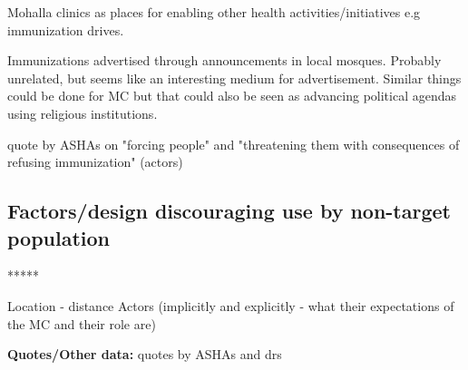Mohalla clinics as places for enabling other health activities/initiatives e.g immunization drives.

Immunizations advertised through announcements in local mosques. Probably unrelated, but seems like an interesting medium for advertisement. Similar things could be done for MC but that could also be seen as advancing political agendas using religious institutions.

quote by ASHAs on "forcing people" and "threatening them with consequences of refusing immunization" (actors)

\subsection{Factors/design discouraging use by non-target population}

*****

Location - distance
Actors (implicitly and explicitly - what their expectations of the MC and their role are)

\textbf{Quotes/Other data:}
quotes by ASHAs and drs